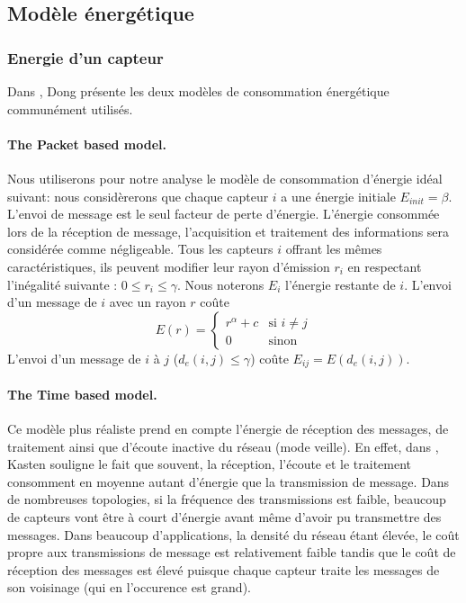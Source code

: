 \subsection{Modèle énergétique}
\subsubsection{Energie d'un capteur}
Dans \cite{Dong2005}, Dong présente les deux modèles de consommation énergétique communément utilisés.
\paragraph{The Packet based model.}
Nous utiliserons pour notre analyse le modèle de consommation d'énergie idéal suivant:
nous considèrerons que chaque capteur $i$ a une énergie initiale $E_{init}=\beta$.
L'envoi de message est le seul facteur de perte d'énergie. L'énergie consommée lors de la réception de message, l'acquisition et traitement des informations sera considérée comme négligeable.
Tous les capteurs $i$ offrant les mêmes caractéristiques, ils peuvent modifier leur rayon d'émission $r_i$ en respectant l'inégalité suivante : $0 \leq r_i \leq \gamma$.
Nous noterons $E_i$ l'énergie restante de $i$.
L'envoi d'un message de $i$ avec un rayon $r$ coûte $$ E(r)= \begin{cases} r^\alpha + c & \text{si }i\neq j \\ 0 & \text{sinon}  \end{cases}$$
L'envoi d'un message de $i$ à $j$ ($d_e(i,j)\leq \gamma$) coûte  $ E_{ij}=E(d_e(i,j))$.

\paragraph{The Time based model.}
Ce modèle plus réaliste prend en compte l'énergie de réception des messages, de traitement ainsi que d'écoute inactive du réseau (mode veille).
En effet, dans \cite{Kasten2001}, Kasten souligne le fait que souvent, la réception, l'écoute et le traitement consomment en moyenne autant d'énergie que la transmission de message.
Dans de nombreuses topologies, si la fréquence des transmissions est faible, beaucoup de capteurs vont être à court d'énergie avant même d'avoir pu transmettre des messages.
Dans beaucoup d'applications, la densité du réseau étant élevée, le coût propre aux transmissions de message est relativement faible tandis que le coût de réception des messages est élevé puisque chaque capteur traite les messages de son voisinage (qui en l'occurence est grand).



